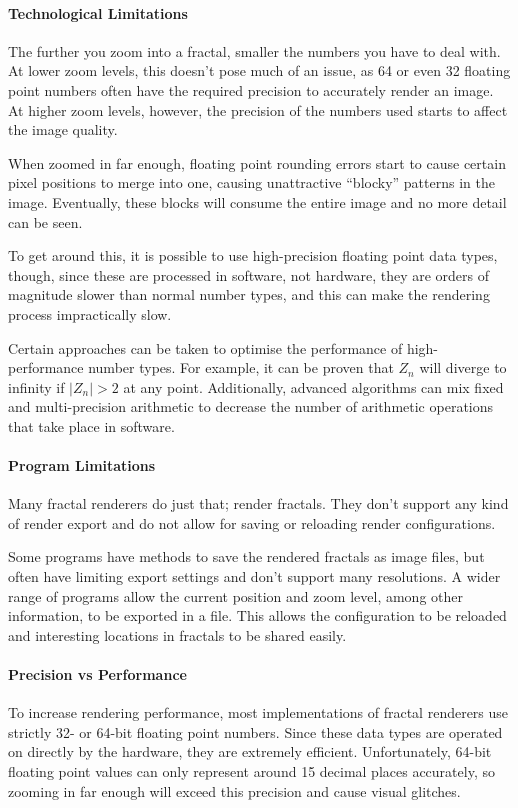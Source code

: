 \begin{multicols}{2}
	
\paragraph{Technological Limitations} The further you zoom into a fractal, smaller the numbers you have to deal with. At lower zoom levels, this doesn't pose much of an issue, as \SI{64}{\bit} or even \SI{32}{\bit} floating point numbers often have the required precision to accurately render an image. At higher zoom levels, however, the precision of the numbers used starts to affect the image quality.

When zoomed in far enough, floating point rounding errors start to cause certain pixel positions to merge into one, causing unattractive ``blocky'' patterns in the image. Eventually, these blocks will consume the entire image and no more detail can be seen.

To get around this, it is possible to use high-precision floating point data types, though, since these are processed in software, not hardware, they are orders of magnitude slower than normal number types, and this can make the rendering process impractically slow.

Certain approaches can be taken to optimise the performance of high-performance number types. For example, it can be proven that \(Z_n\) will diverge to infinity if \(|Z_n|>2\) at any point. Additionally, advanced algorithms can mix fixed and multi-precision arithmetic to decrease the number of arithmetic operations that take place in software.

\paragraph{Program Limitations} Many fractal renderers do just that; render fractals. They don't support any kind of render export and do not allow for saving or reloading render configurations. 

Some programs have methods to save the rendered fractals as image files, but often have limiting export settings and don't support many resolutions. A wider range of programs allow the current position and zoom level, among other information, to be exported in a file. This allows the configuration to be reloaded and interesting locations in fractals to be shared easily.

\paragraph{Precision vs Performance} To increase rendering performance, most implementations of fractal renderers use strictly 32- or 64-bit floating point numbers. Since these data types are operated on directly by the hardware, they are extremely efficient. Unfortunately, 64-bit floating point values can only represent around 15 decimal places accurately, so zooming in far enough will exceed this precision and cause visual glitches.


\end{multicols}
